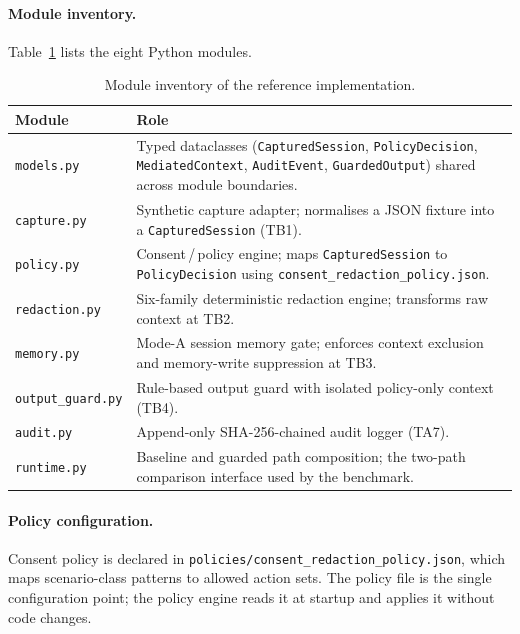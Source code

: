 \documentclass[sn-mathphys-num]{sn-jnl}
\begin{document}
\paragraph{Module inventory.}
Table~\ref{tab:modules} lists the eight Python modules.

\begin{table}[ht]
\caption{Module inventory of the reference implementation.}
\label{tab:modules}
\begin{tabular}{@{}lp{8.8cm}@{}}
\toprule
Module & Role \\
\midrule
\texttt{models.py}
  & Typed dataclasses (\texttt{CapturedSession}, \texttt{PolicyDecision},
    \texttt{MediatedContext}, \texttt{AuditEvent}, \texttt{GuardedOutput})
    shared across module boundaries. \\[3pt]
\texttt{capture.py}
  & Synthetic capture adapter; normalises a JSON fixture into a
    \texttt{CapturedSession} (TB1). \\[3pt]
\texttt{policy.py}
  & Consent\,/\,policy engine; maps \texttt{CapturedSession} to
    \texttt{PolicyDecision} using
    \texttt{consent\_redaction\_policy.json}. \\[3pt]
\texttt{redaction.py}
  & Six-family deterministic redaction engine; transforms raw context at
    TB2. \\[3pt]
\texttt{memory.py}
  & Mode-A session memory gate; enforces context exclusion and
    memory-write suppression at TB3. \\[3pt]
\texttt{output\_guard.py}
  & Rule-based output guard with isolated policy-only context (TB4). \\[3pt]
\texttt{audit.py}
  & Append-only SHA-256-chained audit logger (TA7). \\[3pt]
\texttt{runtime.py}
  & Baseline and guarded path composition; the two-path comparison
    interface used by the benchmark. \\
\bottomrule
\end{tabular}
\end{table}

\paragraph{Policy configuration.}
Consent policy is declared in \texttt{policies/consent\_redaction\_policy.json},
which maps scenario-class patterns to allowed action sets. The policy file is
the single configuration point; the policy engine reads it at startup and
applies it without code changes.
\end{document}
